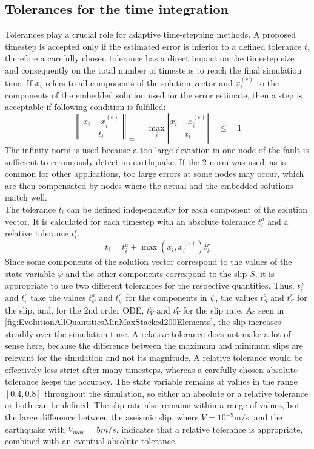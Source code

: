 \subsection{Tolerances for the time integration}
Tolerances play a crucial role for adaptive time-stepping methods. A proposed timestep is accepted only if the estimated error is inferior to a defined tolerance $t$, therefore a carefully chosen tolerance has a direct impact on the timestep size and consequently on the total number of timesteps to reach the final simulation time. If $x_i$ refers to all components of the solution vector and $x_i^{(e)}$ to the components of the embedded solution used for the error estimate, then a step is acceptable if following condition is fulfilled: 
\begin{equation}
\left\|\frac{x_i - x_i^{(e)}}{t_i}\right\|_\infty = \max_i \left|\frac{x_i - x_i^{(e)}}{t_i}\right|
\quad \leq \quad 1
\end{equation}
The infinity norm is used because a too large deviation in one node of the fault is sufficient to erroneously detect an earthquake. If the 2-norm was used, as is common for other applications, too large errors at some nodes may occur, which are then compensated by nodes where the actual and the embedded solutions match well. \\

The tolerance $t_i$ can be defined independently for each component of the solution vector. It is calculated for each timestep with an absolute tolerance $t_i^a$ and a relative tolerance $t_i^r$. 
\begin{equation}
t_i = t_i^a + \max\left(x_i,x_i^{(e)}\right)t_i^r
\end{equation}
Since some components of the solution vector correspond to the values of the state variable $\psi$ and the other components correspond to the slip $S$, it is appropriate to use two different tolerances for the respective quantities. Thus, $t_i^a$ and $t_i^r$ take the values $t_\psi^a$ and $t_\psi^r$ for the components in $\psi$, the values $t_S^a$ and $t_S^r$ for the slip, and, for the 2nd order ODE, $t_V^a$ and $t_V^r$ for the slip rate. As seen in \autoref{fig:EvolutionAllQuantitiesMinMaxStacked200Elements}, the slip increases steadily over the simulation time. A relative tolerance does not make a lot of sense here, because the difference between the maximum and minimum slips are relevant for the simulation and not its magnitude. A relative tolerance would be effectively less strict after many timesteps, whereas a carefully chosen absolute tolerance keeps the accuracy. The state variable remains at values in the range $[0.4, 0.8]$ throughout the simulation, so either an absolute or a relative tolerance or both can be defined. The slip rate also remains within a range of values, but the large difference between the aseismic slip, where $V=10^{-9}$m/s, and the earthquake with $V_{max}=5m/s$, indicates that a relative tolerance is appropriate, combined with an eventual absolute tolerance. 

